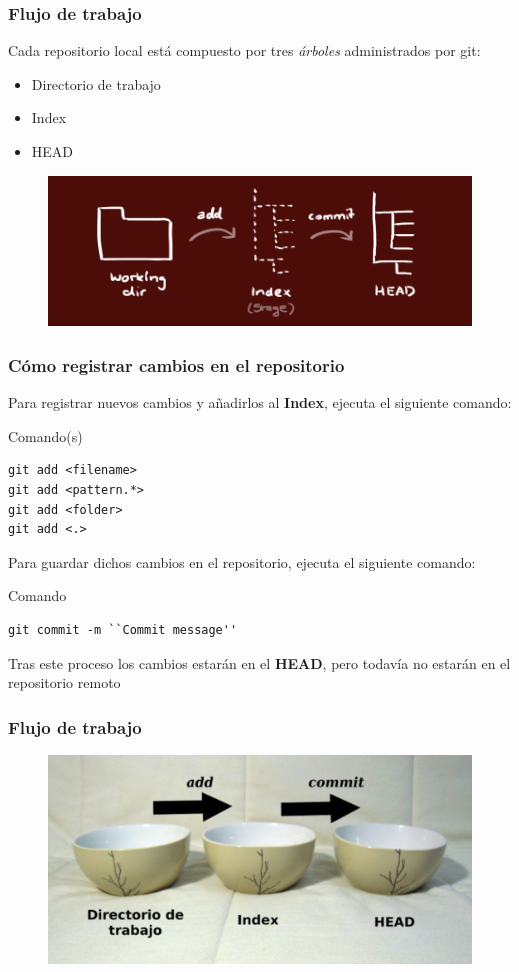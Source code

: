 \documentclass{beamer}
\begin{document}
\begin{frame}
\frametitle{Flujo de trabajo}
Cada repositorio local está compuesto por tres \textit{árboles} administrados por git:
\begin{itemize}
\item Directorio de trabajo
\item Index
\item HEAD
\end{itemize}

\begin{figure}
\includegraphics[width=0.8\linewidth]{img/trees.png}
\end{figure}
\end{frame}

\begin{frame}[fragile]
\frametitle{Cómo registrar cambios en el repositorio}
Para registrar nuevos cambios y añadirlos al \textbf{Index}, ejecuta el siguiente comando:
\begin{block}{Comando(s)}
\begin{verbatim}
git add <filename>
git add <pattern.*>
git add <folder>
git add <.>
\end{verbatim}
\end{block}
\vskip 0.25cm
Para guardar dichos cambios en el repositorio, ejecuta el siguiente comando:
\begin{block}{Comando}
\begin{verbatim}
git commit -m ``Commit message''
\end{verbatim}
\end{block}
\vskip 0.25cm
Tras este proceso los cambios estarán en el \textbf{HEAD}, pero todavía no estarán en el repositorio remoto
\end{frame}

\begin{frame}
\frametitle{Flujo de trabajo}
\begin{figure}
\includegraphics[width=0.8\linewidth]{img/cuencos.png}
\end{figure}
\end{frame}
\end{document}
